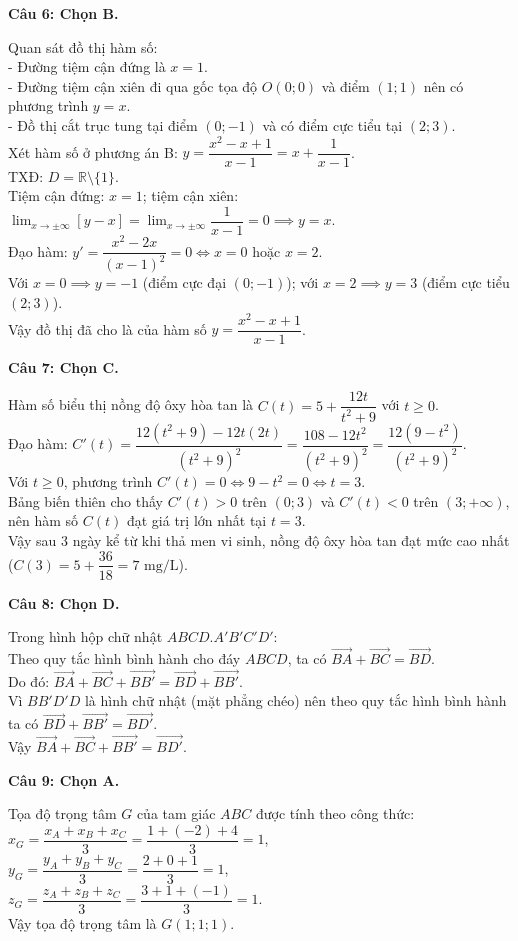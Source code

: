 \documentclass[12pt,a4paper]{article}
\newcommand{\loigiai}[1]{\par\medskip\Needspace{4\baselineskip}\noindent\textbf{#1}\par\nobreak}
\begin{document}
\loigiai{Câu 6: Chọn B.}
Quan sát đồ thị hàm số:\\
- Đường tiệm cận đứng là $x=1$.\\
- Đường tiệm cận xiên đi qua gốc tọa độ $O(0;0)$ và điểm $(1;1)$ nên có phương trình $y=x$.\\
- Đồ thị cắt trục tung tại điểm $(0;-1)$ và có điểm cực tiểu tại $(2;3)$.\\
Xét hàm số ở phương án B: $y=\dfrac{x^2-x+1}{x-1}=x+\dfrac{1}{x-1}$.\\
TXĐ: $D=\mathbb{R}\setminus\{1\}$.\\
Tiệm cận đứng: $x=1$; tiệm cận xiên: $\lim_{x\to \pm\infty}[y-x]=\lim_{x\to \pm\infty}\dfrac{1}{x-1}=0 \implies y=x$.\\
Đạo hàm: $y'=\dfrac{x^2-2x}{(x-1)^2}=0 \iff x=0$ hoặc $x=2$.\\
Với $x=0 \implies y=-1$ (điểm cực đại $(0;-1)$); với $x=2 \implies y=3$ (điểm cực tiểu $(2;3)$).\\
Vậy đồ thị đã cho là của hàm số $y=\dfrac{x^2-x+1}{x-1}$.

\loigiai{Câu 7: Chọn C.}
Hàm số biểu thị nồng độ ôxy hòa tan là $C(t)=5+\dfrac{12t}{t^2+9}$ với $t\ge 0$.\\
Đạo hàm: $C'(t)=\dfrac{12(t^2+9)-12t(2t)}{(t^2+9)^2}=\dfrac{108-12t^2}{(t^2+9)^2}=\dfrac{12(9-t^2)}{(t^2+9)^2}$.\\
Với $t\ge 0$, phương trình $C'(t)=0 \iff 9-t^2=0 \iff t=3$.\\
Bảng biến thiên cho thấy $C'(t)>0$ trên $(0;3)$ và $C'(t)<0$ trên $(3;+\infty)$, nên hàm số $C(t)$ đạt giá trị lớn nhất tại $t=3$.\\
Vậy sau $3$ ngày kể từ khi thả men vi sinh, nồng độ ôxy hòa tan đạt mức cao nhất ($C(3)=5+\dfrac{36}{18}=7\text{ mg/L}$).

\loigiai{Câu 8: Chọn D.}
Trong hình hộp chữ nhật $ABCD.A'B'C'D'$:\\
Theo quy tắc hình bình hành cho đáy $ABCD$, ta có $\vec{BA}+\vec{BC}=\vec{BD}$.\\
Do đó: $\vec{BA}+\vec{BC}+\vec{BB'}=\vec{BD}+\vec{BB'}$.\\
Vì $BB'D'D$ là hình chữ nhật (mặt phẳng chéo) nên theo quy tắc hình bình hành ta có $\vec{BD}+\vec{BB'}=\vec{BD'}$.\\
Vậy $\vec{BA}+\vec{BC}+\vec{BB'}=\vec{BD'}$.

\loigiai{Câu 9: Chọn A.}
Tọa độ trọng tâm $G$ của tam giác $ABC$ được tính theo công thức:\\
$x_G=\dfrac{x_A+x_B+x_C}{3}=\dfrac{1+(-2)+4}{3}=1$,\\
$y_G=\dfrac{y_A+y_B+y_C}{3}=\dfrac{2+0+1}{3}=1$,\\
$z_G=\dfrac{z_A+z_B+z_C}{3}=\dfrac{3+1+(-1)}{3}=1$.\\
Vậy tọa độ trọng tâm là $G(1;1;1)$.
\end{document}
